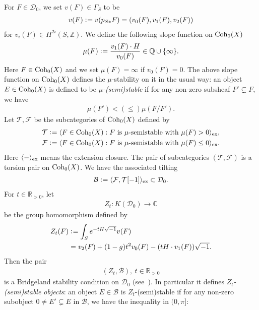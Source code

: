 \documentclass[11pt]{amsart}
\theoremstyle{plain}
\newcommand{\bB}{\mathcal{B}}
\newcommand{\dD}{\mathcal{D}}
\newcommand{\fF}{\mathcal{F}}
\newcommand{\tT}{\mathcal{T}}
\newcommand{\Coh}{\mathop{\rm Coh}\nolimits}
\begin{document}
For $F \in \dD_0$, we
set $v(F) \in \Gamma_S$ to be
\begin{align*}
v(F) \cneq v(p_{S\ast}F)=(v_0(F), v_1(F), v_2(F))
\end{align*}
for $v_i(F) \in H^{2i}(S, \mathbb{Z})$. 
We define the following slope function on 
$\Coh_0(X)$
\begin{align*}
\mu(F) \cneq \frac{v_1(F) \cdot H}{v_0(F)} \in 
\mathbb{Q} \cup \{\infty\}.
\end{align*}
Here $F \in \Coh_0(X)$ and 
we set $\mu(F)=\infty$ if 
$v_0(F)=0$. 
The above slope function on $\Coh_0(X)$ defines the 
$\mu$-stability on it in the usual way: 
an object $E \in \Coh_0(X)$ is defined to be 
\textit{$\mu$-(semi)stable} if for any 
non-zero subsheaf $F' \subsetneq F$, we have 
\begin{align*}
\mu(F') <(\le) \mu(F/F').
\end{align*}
Let $\tT, \fF$ be the subcategories of $\Coh_0(X)$
defined by
\begin{align*}
\tT &\cneq \langle F \in \Coh_0(X) : 
F \mbox{ is } \mu\mbox{-semistable with }\mu(F)>0\rangle_{\rm{ex}}, \\
\fF &\cneq \langle F \in \Coh_0(X) : 
F \mbox{ is } \mu\mbox{-semistable with }\mu(F) \le 0\rangle_{\rm{ex}}.
\end{align*}
Here $\langle - \rangle_{\rm{ex}}$ means the extension closure. 
The pair of subcategories $(\tT, \fF)$ is a torsion 
pair on $\Coh_0(X)$. We have the associated tilting
\begin{align*}
\bB \cneq \langle \fF, \tT[-1] \rangle_{\rm{ex}} \subset \dD_0.
\end{align*}
For $t \in \mathbb{R}_{>0}$, let 
\begin{align}\label{def:Zt}
Z_t \colon K(\dD_0) \to \mathbb{C}
\end{align}
be the group homomorphism 
defined by
\begin{align*}
Z_t(F) &\cneq \int_S e^{-tH \sqrt{-1}} v(F) \\
&= v_2(F)+(1-g)t^2 v_0(F) -(tH \cdot 
v_1(F)) \sqrt{-1}.
\end{align*}
Then the pair 
\begin{align*}
(Z_t, \bB), \ t \in \mathbb{R}_{>0}
\end{align*}
is a Bridgeland stability condition on $\dD_0$
(see~\cite[Lemma~3.3]{TodK3}). 
In particular it defines 
\textit{$Z_t$-(semi)stable objects}: 
an object $E \in \bB$ is 
$Z_t$-(semi)stable if for any 
non-zero subobject $0\neq E' \subsetneq E$
in $\bB$, we have 
the inequality in $(0, \pi]$: 
\end{document}
